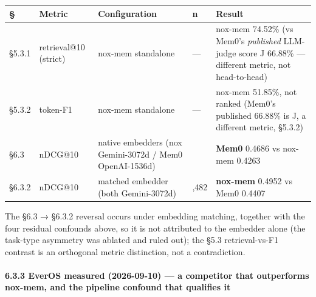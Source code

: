 \documentclass[
]{article}
\newcounter{none} %
\begin{document}
{\def\LTcaptype{none} %
\begin{longtable}[]{@{}
  >{\raggedright\arraybackslash}p{}
  >{\raggedright\arraybackslash}p{}
  >{\raggedright\arraybackslash}p{}
  >{\raggedleft\arraybackslash}p{}
  >{\raggedright\arraybackslash}p{}@{}}
\toprule\noalign{}
\begin{minipage}[b]{\linewidth}\raggedright
§
\end{minipage} & \begin{minipage}[b]{\linewidth}\raggedright
Metric
\end{minipage} & \begin{minipage}[b]{\linewidth}\raggedright
Configuration
\end{minipage} & \begin{minipage}[b]{\linewidth}\raggedleft
n
\end{minipage} & \begin{minipage}[b]{\linewidth}\raggedright
Result
\end{minipage} \\
\midrule\noalign{}
\endhead
\bottomrule\noalign{}
\endlastfoot
§5.3.1 & retrieval@10 (strict) & nox-mem standalone & --- & nox-mem
74.52\% (vs Mem0's \emph{published} LLM-judge score J 66.88\% ---
different metric, not head-to-head) \\
§5.3.2 & token-F1 & nox-mem standalone & --- & nox-mem 51.85\%, not
ranked (Mem0's published 66.88\% is J, a different metric, §5.3.2) \\
§6.3 & nDCG@10 & native embedders (nox Gemini-3072d / Mem0 OpenAI-1536d)
& 100 & \textbf{Mem0} 0.4686 vs nox-mem 0.4263 \\
§6.3.2 & nDCG@10 & matched embedder (both Gemini-3072d) & 2,482 &
\textbf{nox-mem} 0.4952 vs Mem0 0.4407 \\
\end{longtable}
}

The §6.3 → §6.3.2 reversal occurs under embedding matching, together
with the four residual confounds above, so it is not attributed to the
embedder alone (the task-type asymmetry was ablated and ruled out); the
§5.3 retrieval-vs-F1 contrast is an orthogonal metric distinction, not a
contradiction.

\paragraph{6.3.3 EverOS measured (2026-09-10) --- a competitor that
outperforms nox-mem, and the pipeline confound that qualifies
it}\label{everos-measured-2026-09-10-a-competitor-that-outperforms-nox-mem-and-the-pipeline-confound-that-qualifies-it}
\end{document}
